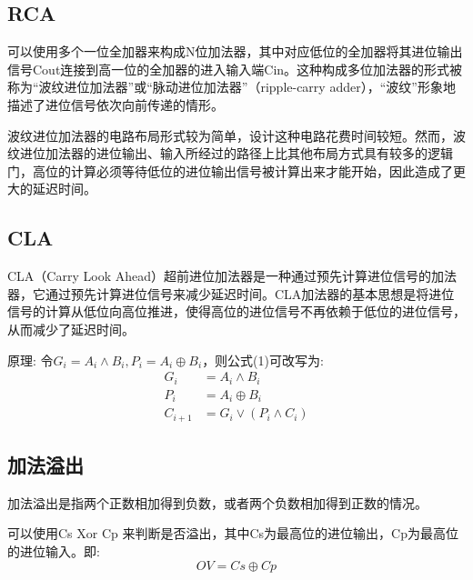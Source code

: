 \documentclass[AutoFakeBold]{LZUThesis}
\begin{document}
\subsection{RCA}
可以使用多个一位全加器来构成N位加法器，其中对应低位的全加器将其进位输出信号Cout连接到高一位的全加器的进入输入端Cin。这种构成多位加法器的形式被称为“波纹进位加法器”或“脉动进位加法器”（ripple-carry adder），“波纹”形象地描述了进位信号依次向前传递的情形。

波纹进位加法器的电路布局形式较为简单，设计这种电路花费时间较短。然而，波纹进位加法器的进位输出、输入所经过的路径上比其他布局方式具有较多的逻辑门，高位的计算必须等待低位的进位输出信号被计算出来才能开始，因此造成了更大的延迟时间。

\subsection{CLA}
CLA（Carry Look Ahead）超前进位加法器是一种通过预先计算进位信号的加法器，它通过预先计算进位信号来减少延迟时间。CLA加法器的基本思想是将进位信号的计算从低位向高位推进，使得高位的进位信号不再依赖于低位的进位信号，从而减少了延迟时间。

原理: 
令$G_i = A_i \land B_i, P_i = A_i \oplus B_i$，则公式(1)可改写为:
\begin{equation}
    \begin{aligned}
        G_i & = A_i \land B_i \\
        P_i & = A_i \oplus B_i \\
        C_{i+1} & = G_i \lor (P_i \land C_i)
    \end{aligned}
\end{equation}

\subsection{加法溢出}
加法溢出是指两个正数相加得到负数，或者两个负数相加得到正数的情况。

可以使用Cs Xor Cp 来判断是否溢出，其中Cs为最高位的进位输出，Cp为最高位的进位输入。即:
\begin{equation}
    OV = Cs \oplus Cp
\end{equation}
\end{document}

